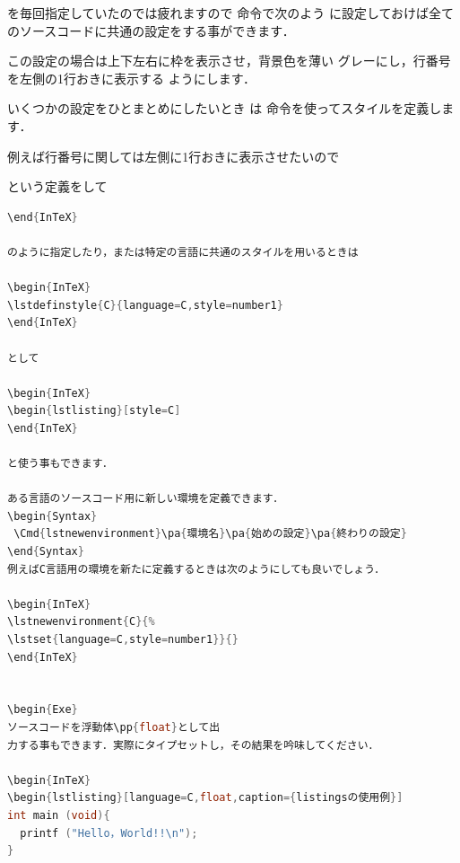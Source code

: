 を毎回指定していたのでは疲れますので 命令で次のよう
に設定しておけば全てのソースコードに共通の設定をする事ができます．

\begin{InTeX}
\usepackage[dvips]{color}
\end{InTeX}

この設定の場合は上下左右に枠を表示させ，背景色を薄い
グレーにし，行番号を左側の1行おきに表示する%
ようにします．

いくつかの設定をひとまとめにしたいとき
は 命令を使ってスタイルを定義します．
\begin{Syntax}
\end{Syntax}
例えば行番号に関しては左側に1行おきに表示させたいので

\begin{InTeX}
\end{InTeX}

という定義をして

\begin{InTeX}
\begin{lstlisting}[language=C,style=number1]
\end{InTeX}

のように指定したり，または特定の言語に共通のスタイルを用いるときは

\begin{InTeX}
\lstdefinstyle{C}{language=C,style=number1}
\end{InTeX}

として

\begin{InTeX}
\begin{lstlisting}[style=C]
\end{InTeX}

と使う事もできます．

ある言語のソースコード用に新しい環境を定義できます．
\begin{Syntax}
 \Cmd{lstnewenvironment}\pa{環境名}\pa{始めの設定}\pa{終わりの設定}
\end{Syntax}
例えばC言語用の環境を新たに定義するときは次のようにしても良いでしょう．

\begin{InTeX}
\lstnewenvironment{C}{%
\lstset{language=C,style=number1}}{}
\end{InTeX}


\begin{Exe}
ソースコードを浮動体\pp{float}として出
力する事もできます．実際にタイプセットし，その結果を吟味してください．

\begin{InTeX}
\begin{lstlisting}[language=C,float,caption={listingsの使用例}]
int main (void){
  printf ("Hello，World!!\n");
}
\end{lstlisting}
\end{InTeX}

